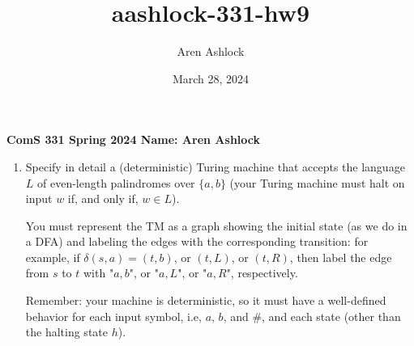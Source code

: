 \documentclass[12pt]{article}
\title{aashlock-331-hw9}
\author{Aren Ashlock}
\date{March 28, 2024}
\begin{document}
\noindent\textbf{ComS 331 \quad Spring 2024 \quad Name: Aren Ashlock}

\begin{enumerate}


\item Specify in detail a (deterministic) Turing machine that accepts the language $L$ of even-length palindromes over $\{a,b\}$ (your Turing machine must halt on input $w$ if, and only if, $w \in L$).

You must represent the TM as a graph showing the initial state (as we do in a DFA) and labeling the edges with the corresponding transition: for example, if $\delta(s,a) = (t,b)$, or $(t,L)$, or $(t,R)$, then label the edge from $s$ to $t$ with "$a,b$", or "$a,L$", or "$a,R$", respectively.

Remember: your machine is deterministic, so it must have a well-defined behavior for each input symbol, i.e, $a$, $b$, and \#, and each state (other than the halting state $h$).

\end{enumerate}
\end{document}
